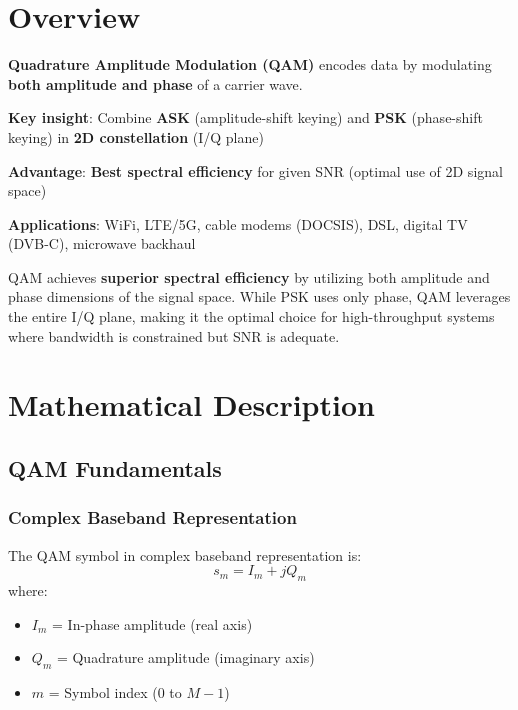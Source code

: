 \section{Overview}

\textbf{Quadrature Amplitude Modulation (QAM)} encodes data by
modulating \textbf{both amplitude and phase} of a carrier wave.

\textbf{Key insight}: Combine \textbf{ASK} (amplitude-shift keying) and
\textbf{PSK} (phase-shift keying) in \textbf{2D constellation} (I/Q
plane)

\textbf{Advantage}: \textbf{Best spectral efficiency} for given SNR
(optimal use of 2D signal space)

\textbf{Applications}: WiFi, LTE/5G, cable modems (DOCSIS), DSL, digital
TV (DVB-C), microwave backhaul

\begin{keyconcept}
QAM achieves \textbf{superior spectral efficiency} by utilizing both amplitude and phase dimensions of the signal space. While PSK uses only phase, QAM leverages the entire I/Q plane, making it the optimal choice for high-throughput systems where bandwidth is constrained but SNR is adequate.
\end{keyconcept}

\section{Mathematical Description}

\subsection{QAM Fundamentals}

\subsubsection{Complex Baseband Representation}

The QAM symbol in complex baseband representation is:
\begin{equation}
s_m = I_m + jQ_m
\label{eq:qam-symbol}
\end{equation}
where:
\begin{itemize}
\item $I_m$ = In-phase amplitude (real axis)
\item $Q_m$ = Quadrature amplitude (imaginary axis)
\item $m$ = Symbol index ($0$ to $M-1$)
\end{itemize}

